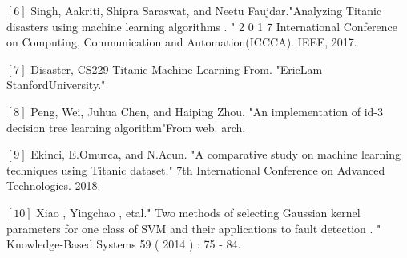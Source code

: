 \documentclass[12pt]{article}
\newcommand{\nd}{\noindent}
\begin{document}
\nd$[6]$ Singh, Aakriti, Shipra Saraswat, and Neetu Faujdar."Analyzing Titanic disasters using machine learning algorithms . " 2 0 1 7 International Conference on Computing, Communication and Automation(ICCCA). IEEE, 2017.

\nd$[7]$ Disaster, CS229 Titanic-Machine Learning From. "EricLam StanfordUniversity."

\nd$[8]$ Peng, Wei, Juhua Chen, and Haiping Zhou. "An implementation of id-3 decision tree learning algorithm"From web. arch.

\nd$[9]$ Ekinci, E.Omurca, and N.Acun. "A comparative study on machine learning techniques using Titanic dataset." 7th International Conference on Advanced Technologies. 2018.

\nd$[10]$ Xiao , Yingchao , etal." Two methods of selecting Gaussian kernel parameters for one class of SVM and their applications to fault detection . " Knowledge-Based Systems 59 ( 2014 ) : 75 - 84.
\end{document}
